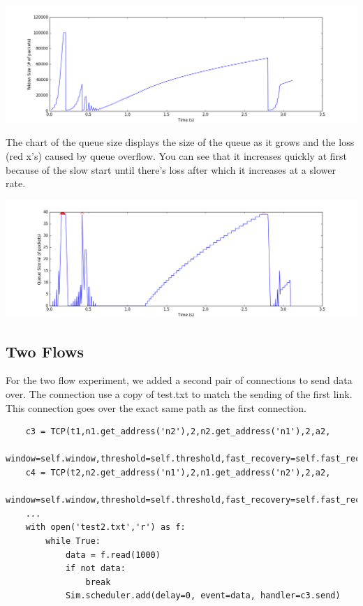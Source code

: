 \documentclass[11pt]{article}
\begin{document}
\vspace{5mm}

\includegraphics[width=17cm]{charts/one/windowSize1.png}

\vspace{5mm}

The chart of the queue size displays the size of the queue as it grows and the loss (red x's) caused by queue overflow. You can see that it increases quickly at first because of the slow start until there's loss after which it increases at a slower rate.

\vspace{5mm}

\includegraphics[width=17cm]{charts/one/queueSize.png}

\vspace{5mm}

\subsection{Two Flows}

For the two flow experiment, we added a second pair of connections to send data over. The connection use a copy of test.txt to match the sending of the first link. This connection goes over the exact same path as the first connection.

\vspace{5mm}

\begin{lstlisting}
    c3 = TCP(t1,n1.get_address('n2'),2,n2.get_address('n1'),2,a2,
        window=self.window,threshold=self.threshold,fast_recovery=self.fast_recovery)
    c4 = TCP(t2,n2.get_address('n1'),2,n1.get_address('n2'),2,a2,
        window=self.window,threshold=self.threshold,fast_recovery=self.fast_recovery)
    ...
    with open('test2.txt','r') as f:
        while True:
            data = f.read(1000)
            if not data:
                break
            Sim.scheduler.add(delay=0, event=data, handler=c3.send)
\end{lstlisting}
\end{document}
